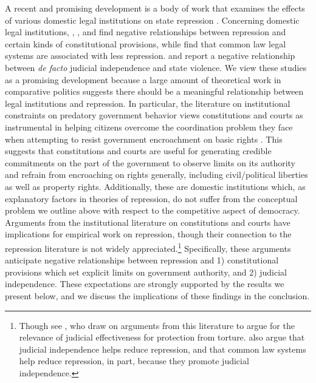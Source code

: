 \documentclass[12pt]{article}
\begin{document}
A recent and promising development is a body of work that examines the effects of various domestic legal institutions on state repression \citep{Davenport1996JOP,Cross1999,KeithTatePoe2009,PowellStaton2009,Mitchell2013}. Concerning domestic legal institutions, \citet{Davenport1996JOP}, \citet{Cross1999}, and \citet{KeithTatePoe2009} find negative relationships between repression and certain kinds of constitutional provisions, while \citet{Mitchell2013} find that common law legal systems are associated with less repression. \citet{PowellStaton2009} and \citet{Mitchell2013} report a negative relationship between {\it de facto} judicial independence and state violence. We view these studies as a promising development because a large amount of theoretical work in comparative politics suggests there should be a meaningful relationship between legal institutions and repression. In particular, the literature on institutional constraints on predatory government behavior views constitutions and courts as instrumental in helping citizens overcome the coordination problem they face when attempting to resist government encroachment on basic rights \citep{NorthWeingast1989, Ordeshook1992, Weingast1997, Carey2000, Vanberg2005, ElkinsGinsburgMelton2009}. This suggests that constitutions and courts are useful for generating credible commitments on the part of the government to observe limits on its authority and refrain from encroaching on rights generally, including civil/political liberties as well as property rights. Additionally, these are domestic institutions which, as explanatory factors in theories of repression, do not suffer from the conceptual problem we outline above with respect to the competitive aspect of democracy. Arguments from the institutional literature on constitutions and courts have implications for empirical work on repression, though their connection to the repression literature is not widely appreciated.\footnote{Though see \citet{PowellStaton2009}, who draw on arguments from this literature to argue for the relevance of judicial effectiveness for protection from torture. \citet{Mitchell2013} also argue that judicial independence helps reduce repression, and that common law systems help reduce repression, in part, because they promote judicial independence.} Specifically, these arguments anticipate negative relationships between repression and 1) constitutional provisions which set explicit limits on government authority, and 2) judicial independence. These expectations are strongly supported by the results we present below, and we discuss the implications of these findings in the conclusion. 
\end{document}
